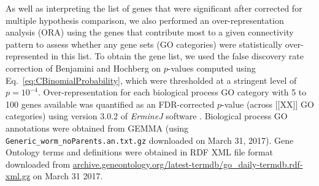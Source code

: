 \documentclass[10pt,letterpaper]{article}
\begin{document}
As well as interpreting the list of genes that were significant after corrected for multiple hypothesis comparison, we also performed an over-representation analysis (ORA) using the genes that contribute most to a given connectivity pattern to assess whether any gene sets (GO categories) were statistically over-represented in this list.
To obtain the gene list, we used the false discovery rate correction of Benjamini and Hochberg \cite{Benjamini:1995cd} on $p$-values computed using Eq.~\eqref{eq:CBinomialProbability}, which were thresholded at a stringent level of $p = 10^{-4}$.
Over-representation for each biological process GO category with 5 to 100 genes available was quantified as an FDR-corrected $p$-value (across [[XX]] GO categories) using version 3.0.2 of \emph{ErmineJ} software \cite{Gillis2010}.
Biological process GO annotations \cite{Ashburner2000} were obtained from GEMMA \cite{Zoubarev2012} (using \texttt{Generic\_worm\_noParents.an.txt.gz} downloaded on March 31, 2017).
Gene Ontology terms and definitions were obtained in RDF XML file format downloaded from \url{archive.geneontology.org/latest-termdb/go_daily-termdb.rdf-xml.gz} on March 31 2017.

\end{document}
